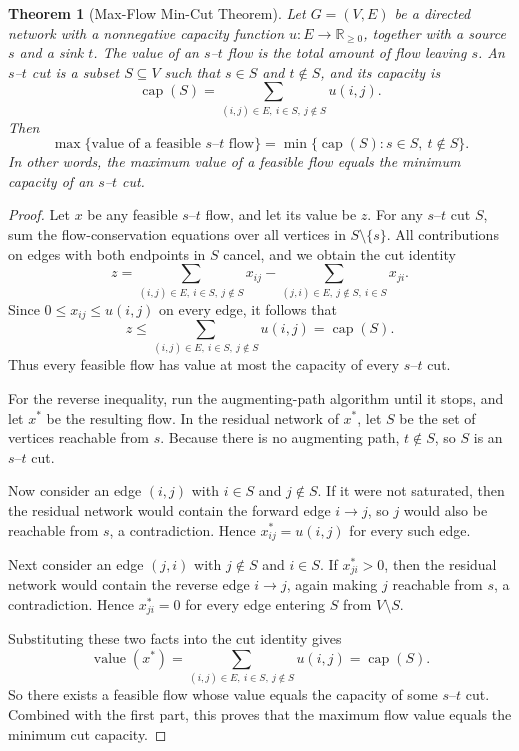 \documentclass[11pt]{article}
\newtheorem{theorem}{Theorem}
\begin{document}
\begin{theorem}[Max-Flow Min-Cut Theorem]
\label{thm:maxflowmincut}
Let $G=(V,E)$ be a directed network with a nonnegative capacity function
$u:E\to\mathbb{R}_{\ge 0}$, together with a source $s$ and a sink $t$. The
value of an $s$--$t$ flow is the total amount of flow leaving $s$. An
$s$--$t$ cut is a subset $S\subseteq V$ such that $s\in S$ and $t\notin S$,
and its capacity is
\[
\operatorname{cap}(S)=\sum_{(i,j)\in E,\ i\in S,\ j\notin S} u(i,j).
\]
Then
\[
\max\{\text{value of a feasible } s\text{--}t \text{ flow}\}
=
\min\{\operatorname{cap}(S): s\in S,\ t\notin S\}.
\]
In other words, the maximum value of a feasible flow equals the minimum
capacity of an $s$--$t$ cut.
\end{theorem}

\begin{proof}
Let $x$ be any feasible $s$--$t$ flow, and let its value be $z$. For any
$s$--$t$ cut $S$, sum the flow-conservation equations over all vertices in
$S\setminus\{s\}$. All contributions on edges with both endpoints in $S$
cancel, and we obtain the cut identity
\[
z
=
\sum_{(i,j)\in E,\ i\in S,\ j\notin S} x_{ij}
-
\sum_{(j,i)\in E,\ j\notin S,\ i\in S} x_{ji}.
\]
Since $0\le x_{ij}\le u(i,j)$ on every edge, it follows that
\[
z\le
\sum_{(i,j)\in E,\ i\in S,\ j\notin S} u(i,j)
=
\operatorname{cap}(S).
\]
Thus every feasible flow has value at most the capacity of every $s$--$t$ cut.

For the reverse inequality, run the augmenting-path algorithm until it stops,
and let $x^*$ be the resulting flow. In the residual network of $x^*$, let
$S$ be the set of vertices reachable from $s$. Because there is no augmenting
path, $t\notin S$, so $S$ is an $s$--$t$ cut.

Now consider an edge $(i,j)$ with $i\in S$ and $j\notin S$. If it were not
saturated, then the residual network would contain the forward edge
$i\to j$, so $j$ would also be reachable from $s$, a contradiction. Hence
$x^*_{ij}=u(i,j)$ for every such edge.

Next consider an edge $(j,i)$ with $j\notin S$ and $i\in S$. If
$x^*_{ji}>0$, then the residual network would contain the reverse edge
$i\to j$, again making $j$ reachable from $s$, a contradiction. Hence
$x^*_{ji}=0$ for every edge entering $S$ from $V\setminus S$.

Substituting these two facts into the cut identity gives
\[
\operatorname{value}(x^*)
=
\sum_{(i,j)\in E,\ i\in S,\ j\notin S} u(i,j)
=
\operatorname{cap}(S).
\]
So there exists a feasible flow whose value equals the capacity of some
$s$--$t$ cut. Combined with the first part, this proves that the maximum flow
value equals the minimum cut capacity.
\end{proof}
\end{document}
